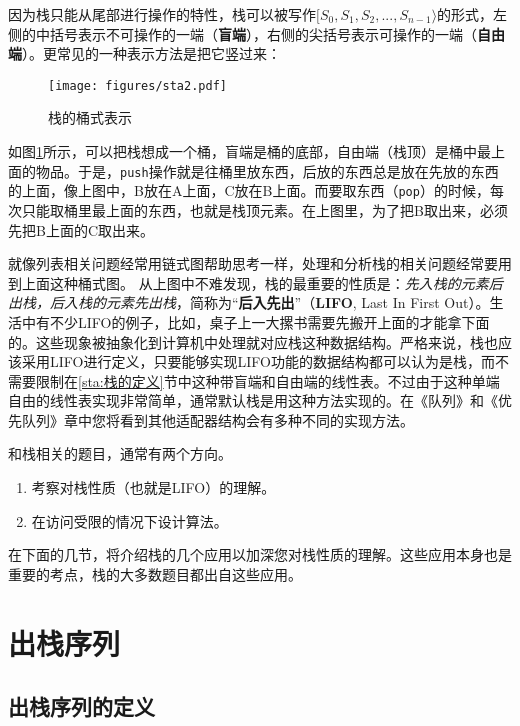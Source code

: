 因为栈只能从尾部进行操作的特性，栈可以被写作$[ S_0, S_1, S_2, ..., S_{n-1} \rangle$的形式，左侧的中括号表示不可操作的一端（\textbf{盲端}），右侧的尖括号表示可操作的一端（\textbf{自由端}）。更常见的一种表示方法是把它竖过来：

\begin{figure}
  \centering
  \texttt{[image: figures/sta2.pdf]}
  \caption{栈的桶式表示}
  \label{fig:sta2}
\end{figure}

如图\ref{fig:sta2}所示，可以把栈想成一个桶，盲端是桶的底部，自由端（栈顶）是桶中最上面的物品。于是，\lstinline{push}操作就是往桶里放东西，后放的东西总是放在先放的东西的上面，像上图中，B放在A上面，C放在B上面。而要取东西（\lstinline{pop}）的时候，每次只能取桶里最上面的东西，也就是栈顶元素。在上图里，为了把B取出来，必须先把B上面的C取出来。

就像列表相关问题经常用链式图帮助思考一样，处理和分析栈的相关问题经常要用到上面这种桶式图。
从上图中不难发现，栈的最重要的性质是：\textit{先入栈的元素后出栈，后入栈的元素先出栈}，简称为“\textbf{后入先出}”（\textbf{LIFO}, Last In First Out）。生活中有不少LIFO的例子，比如，桌子上一大摞书需要先搬开上面的才能拿下面的。这些现象被抽象化到计算机中处理就对应栈这种数据结构。严格来说，栈也应该采用LIFO进行定义，只要能够实现LIFO功能的数据结构都可以认为是栈，而不需要限制在\ref{sta:栈的定义}节中这种带盲端和自由端的线性表。不过由于这种单端自由的线性表实现非常简单，通常默认栈是用这种方法实现的。在《队列》和《优先队列》章中您将看到其他适配器结构会有多种不同的实现方法。

和栈相关的题目，通常有两个方向。

\begin{enumerate}
    \item 考察对栈性质（也就是LIFO）的理解。
    \item 在访问受限的情况下设计算法。
\end{enumerate}

在下面的几节，将介绍栈的几个应用以加深您对栈性质的理解。这些应用本身也是重要的考点，栈的大多数题目都出自这些应用。

\section{出栈序列}

\subsection{出栈序列的定义}

